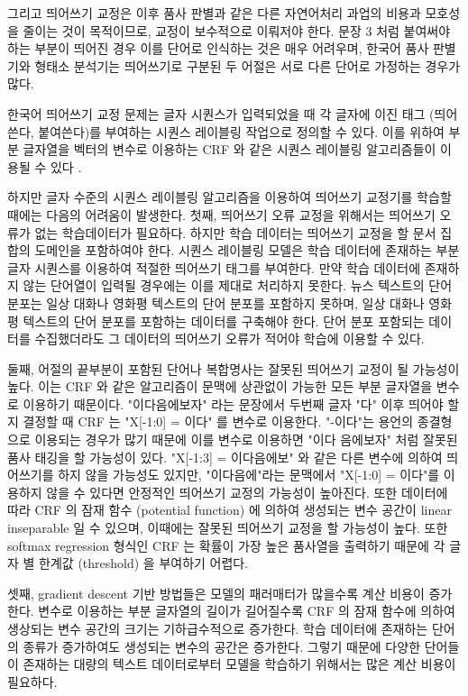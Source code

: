 \documentclass[11pt]{article}
\begin{document}
그리고 띄어쓰기 교정은 이후 품사 판별과 같은 다른 자연어처리 과업의 비용과 모호성을 줄이는 것이 목적이므로, 교정이 보수적으로 이뤄저야 한다.
문장 3 처럼 붙여써야 하는 부분이 띄어진 경우 이를 단어로 인식하는 것은 매우 어려우며, 한국어 품사 판별기와 형태소 분석기는 띄어쓰기로 구분된 두 어절은 서로 다른 단어로 가정하는 경우가 많다.

한국어 띄어쓰기 교정 문제는 글자 시퀀스가 입력되었을 때 각 글자에 이진 태그 (띄어쓴다, 붙여쓴다)를 부여하는 시퀀스 레이블링 작업으로 정의할 수 있다.
이를 위하여 부분 글자열을 벡터의 변수로 이용하는 CRF 와 같은 시퀀스 레이블링 알고리즘들이 이용될 수 있다 \citep{lee2002automatic, lee2007automatic, shim2011crf, lee2013automatic, lee2013joint, Lee2017adatadriven, hong2007korean, kang2006category}.

하지만 글자 수준의 시퀀스 레이블링 알고리즘을 이용하여 띄어쓰기 교정기를 학습할 때에는 다음의 어려움이 발생한다.
첫째, 띄어쓰기 오류 교정을 위해서는 띄어쓰기 오류가 없는 학습데이터가 필요하다.
하지만 학습 데이터는 띄어쓰기 교정을 할 문서 집합의 도메인을 포함하여야 한다.
시퀀스 레이블링 모델은 학습 데이터에 존재하는 부분 글자 시퀀스를 이용하여 적절한 띄어쓰기 태그를 부여한다.
만약 학습 데이터에 존재하지 않는 단어열이 입력될 경우에는 이를 제대로 처리하지 못한다.
뉴스 텍스트의 단어 분포는 일상 대화나 영화평 텍스트의 단어 분포를 포함하지 못하며, 일상 대화나 영화평 텍스트의 단어 분포를 포함하는 데이터를 구축해야 한다.
단어 분포 포함되는 데이터를 수집했더라도 그 데이터의 띄어쓰기 오류가 적어야 학습에 이용할 수 있다.

둘째, 어절의 끝부분이 포함된 단어나 복합명사는 잘못된 띄어쓰기 교정이 될 가능성이 높다.
이는 CRF 와 같은 알고리즘이 문맥에 상관없이 가능한 모든 부분 글자열을 변수로 이용하기 때문이다.
"이다음에보자" 라는 문장에서 두번째 글자 "다" 이후 띄어야 할지 결정할 때 CRF 는 "X[-1:0] = 이다" 를 변수로 이용한다.
"-이다"는 용언의 종결형으로 이용되는 경우가 많기 때문에 이를 변수로 이용하면 "이다 음에보자" 처럼 잘못된 품사 태깅을 할 가능성이 있다.
"X[-1:3] = 이다음에보" 와 같은 다른 변수에 의하여 띄어쓰기를 하지 않을 가능성도 있지만, "이다음에"라는 문맥에서 "X[-1:0] = 이다"를 이용하지 않을 수 있다면 안정적인 띄어쓰기 교정의 가능성이 높아진다.
또한 데이터에 따라 CRF 의 잠재 함수 (potential function) 에 의하여 생성되는 변수 공간이 linear inseparable 일 수 있으며, 이때에는 잘못된 띄어쓰기 교정을 할 가능성이 높다.
또한 softmax regression 형식인 CRF 는 확률이 가장 높은 품사열을 출력하기 때문에 각 글자 별 한계값 (threshold) 을 부여하기 어렵다.

셋째, gradient descent 기반 방법들은 모델의 패러매터가 많을수록 계산 비용이 증가한다.
변수로 이용하는 부분 글자열의 길이가 길어질수록 CRF 의 잠재 함수에 의하여 생상되는 변수 공간의 크기는 기하급수적으로 증가한다.
학습 데이터에 존재하는 단어의 종류가 증가하여도 생성되는 변수의 공간은 증가한다.
그렇기 때문에 다양한 단어들이 존재하는 대량의 텍스트 데이터로부터 모델을 학습하기 위해서는 많은 계산 비용이 필요하다.
\end{document}
